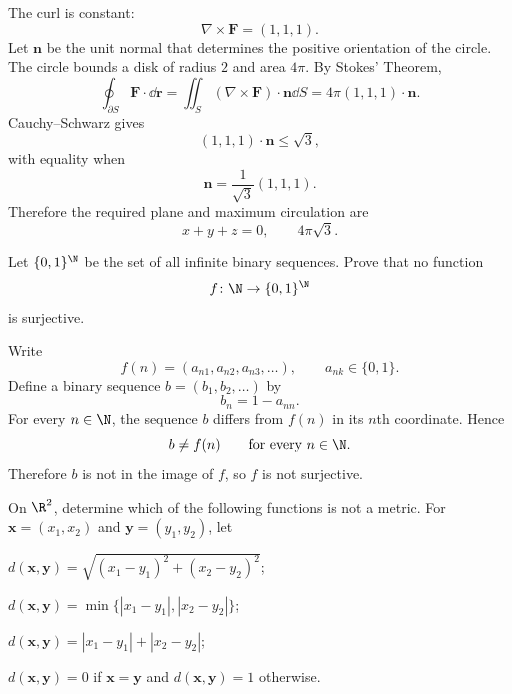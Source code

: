     \begin{solution}
        The curl is constant:
        \[
            \nabla\times\mathbf{F}
            =
            (1,1,1).
        \]
        Let $\mathbf{n}$ be the unit normal that determines the positive
        orientation of the circle. The circle bounds a disk of radius $2$ and
        area $4\pi$. By Stokes' Theorem,
        \[
            \oint_{\partial S}\mathbf{F}\cdot\dd\mathbf{r}
            =
            \iint_S
            (\nabla\times\mathbf{F})\cdot\mathbf{n}\dd S
            =
            4\pi(1,1,1)\cdot\mathbf{n}.
        \]
        Cauchy--Schwarz gives
        \[
            (1,1,1)\cdot\mathbf{n}
            \leq
            \sqrt{3},
        \]
        with equality when
        \[
            \mathbf{n}
            =
            \frac{1}{\sqrt3}(1,1,1).
        \]
        Therefore the required plane and maximum circulation are
        \[
            \boxed{x+y+z=0},
            \qquad
            \boxed{4\pi\sqrt3}.
        \]
    \end{solution}

    \begin{expectedproblem}
        Let $\{0,1\}^{\N}$ be the set of all infinite binary sequences. Prove
        that no function
        \[
            f\colon\N\to\{0,1\}^{\N}
        \]
        is surjective.
    \end{expectedproblem}

    \begin{solution}
        Write
        \[
            f(n)=(a_{n1},a_{n2},a_{n3},\ldots),
            \qquad
            a_{nk}\in\{0,1\}.
        \]
        Define a binary sequence $b=(b_1,b_2,\ldots)$ by
        \[
            b_n=1-a_{nn}.
        \]
        For every $n\in\N$, the sequence $b$ differs from $f(n)$ in its
        $n$th coordinate. Hence
        \[
            b\neq f(n)
            \qquad
            \text{for every }n\in\N.
        \]
        Therefore $b$ is not in the image of $f$, so $f$ is not surjective.
    \end{solution}

    \begin{expectedproblem}
        On $\R^2$, determine which of the following functions is not a metric.
        For $\mathbf{x}=(x_1,x_2)$ and $\mathbf{y}=(y_1,y_2)$, let
        \begin{problemchoices}
            \item $d(\mathbf{x},\mathbf{y})
                  =\sqrt{(x_1-y_1)^2+(x_2-y_2)^2}$;
            \item $d(\mathbf{x},\mathbf{y})
                  =\min\{|x_1-y_1|,|x_2-y_2|\}$;
            \item $d(\mathbf{x},\mathbf{y})
                  =|x_1-y_1|+|x_2-y_2|$;
            \item $d(\mathbf{x},\mathbf{y})=0$ if $\mathbf{x}=\mathbf{y}$ and
                  $d(\mathbf{x},\mathbf{y})=1$ otherwise.
        \end{problemchoices}
    \end{expectedproblem}

